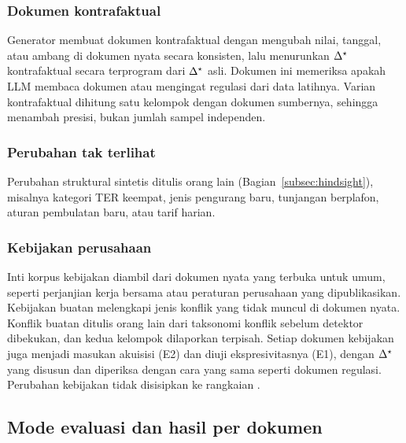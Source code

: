 \subsubsection{Dokumen kontrafaktual}
Generator membuat dokumen kontrafaktual dengan mengubah nilai, tanggal, atau ambang di dokumen nyata secara konsisten, lalu menurunkan $\Delta^{\star}$ kontrafaktual secara terprogram dari $\Delta^{\star}$ asli. Dokumen ini memeriksa apakah LLM membaca dokumen atau mengingat regulasi dari data latihnya. Varian kontrafaktual dihitung satu kelompok dengan dokumen sumbernya, sehingga menambah presisi, bukan jumlah sampel independen.

\subsubsection{Perubahan tak terlihat}
Perubahan struktural sintetis ditulis orang lain (Bagian~\ref{subsec:hindsight}), misalnya kategori TER keempat, jenis pengurang baru, tunjangan berplafon, aturan pembulatan baru, atau tarif harian.

\subsubsection{Kebijakan perusahaan}
Inti korpus kebijakan diambil dari dokumen nyata yang terbuka untuk umum, seperti perjanjian kerja bersama atau peraturan perusahaan yang dipublikasikan. Kebijakan buatan melengkapi jenis konflik yang tidak muncul di dokumen nyata. Konflik buatan ditulis orang lain dari taksonomi konflik sebelum detektor dibekukan, dan kedua kelompok dilaporkan terpisah. Setiap dokumen kebijakan juga menjadi masukan akuisisi (E2) dan diuji ekspresivitasnya (E1), dengan $\Delta^{\star}$ yang disusun dan diperiksa dengan cara yang sama seperti dokumen regulasi. Perubahan kebijakan tidak disisipkan ke rangkaian .


\subsection{Mode evaluasi dan hasil per dokumen}
\label{subsec:mode}

